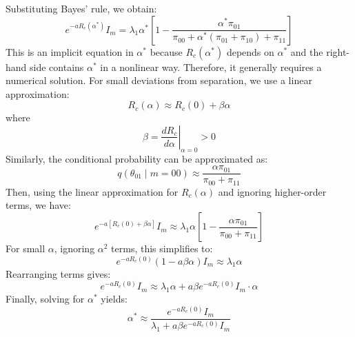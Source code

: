 \documentclass[sigconf,review]{acmart}
\begin{document}
Substituting Bayes' rule, we obtain:
\begin{equation}
e^{-a R_c(\alpha^*)} I_m = \lambda_1 \alpha^* \left[ 1 - \frac{\alpha^* \pi_{01}}{\pi_{00} + \alpha^*(\pi_{01} + \pi_{10}) + \pi_{11}} \right]
\end{equation}
This is an implicit equation in $\alpha^*$ because $R_c(\alpha^*)$ depends on $\alpha^*$ and the right-hand side contains $\alpha^*$ in a nonlinear way. Therefore, it generally requires a numerical solution. For small deviations from separation, we use a linear approximation:
\begin{equation}
R_c(\alpha) \approx R_c(0) + \beta \alpha
\end{equation}
where
\begin{equation}
\beta = \left. \frac{d R_c}{d \alpha} \right|_{\alpha = 0} > 0
\end{equation}
Similarly, the conditional probability can be approximated as:
\begin{equation}
q(\theta_{01} \mid m = 00) \approx \frac{\alpha \pi_{01}}{\pi_{00} + \pi_{11}}
\end{equation}
Then, using the linear approximation for $R_c(\alpha)$ and ignoring higher-order terms, we have:
\begin{equation}
e^{-a [R_c(0) + \beta \alpha]} I_m \approx \lambda_1 \alpha \left[ 1 - \frac{\alpha \pi_{01}}{\pi_{00} + \pi_{11}} \right]
\end{equation}
For small $\alpha$, ignoring $\alpha^2$ terms, this simplifies to:
\begin{equation}
e^{-a R_c(0)} (1 - a \beta \alpha) I_m \approx \lambda_1 \alpha
\end{equation}
Rearranging terms gives:
\begin{equation}
e^{-a R_c(0)} I_m \approx \lambda_1 \alpha + a \beta e^{-a R_c(0)} I_m \cdot \alpha
\end{equation}
Finally, solving for $\alpha^*$ yields:
\begin{equation}
\alpha^* \approx \frac{e^{-a R_c(0)} I_m}{\lambda_1 + a \beta e^{-a R_c(0)} I_m}
\end{equation}
\end{document}

